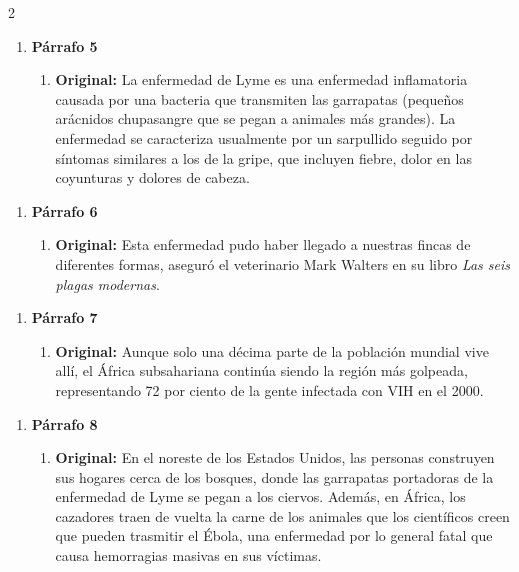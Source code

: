 \documentclass{article}
\begin{document}
\begin{multicols}{2}
	\begin{enumerate}[label={{\textcolor{trueblue}{\textbf{Ej}. \arabic*.0}}}, start=5]
		\item \textbf{Párrafo 5}
		\begin{enumerate}
			\item \textbf{Original:} La enfermedad de Lyme es una enfermedad inflamatoria causada por
			una bacteria que transmiten las garrapatas (pequeños arácnidos chupasangre que
			se pegan a animales más grandes). La enfermedad se caracteriza usualmente por
			un sarpullido seguido por síntomas similares a los de la gripe, que incluyen fiebre,
			dolor en las coyunturas y dolores de cabeza.
		\end{enumerate}
	\end{enumerate}
	
	\begin{enumerate}[label={{\textcolor{trueblue}{\textbf{Ej}. \arabic*.0}}}, start=6]
		\item \textbf{Párrafo 6}
		\begin{enumerate}
			\item \textbf{Original:} Esta enfermedad pudo haber llegado a nuestras fincas de diferentes formas, aseguró el veterinario Mark Walters en su libro \textit{Las seis plagas modernas}.
		\end{enumerate}
	\end{enumerate}
	
	\begin{enumerate}[label={{\textcolor{trueblue}{\textbf{Ej}. \arabic*.0}}}, start=7]
		\item \textbf{Párrafo 7}
		\begin{enumerate}
			\item \textbf{Original:} Aunque solo una décima parte de la población mundial vive allí, el África
			subsahariana continúa siendo la región más golpeada, representando 72 por ciento
			de la gente infectada con VIH en el 2000.
		\end{enumerate}
	\end{enumerate}
	
	\begin{enumerate}[label={{\textcolor{trueblue}{\textbf{Ej}. \arabic*.0}}}, start=8]
		\item \textbf{Párrafo 8}
		\begin{enumerate}
			\item \textbf{Original:}  En el noreste de los Estados Unidos, las personas construyen sus
			hogares cerca de los bosques, donde las garrapatas portadoras de la enfermedad
			de Lyme se pegan a los ciervos. Además, en África, los cazadores traen de vuelta
			la carne de los animales que los científicos creen que pueden trasmitir el Ébola, una
			enfermedad por lo general fatal que causa hemorragias masivas en sus víctimas.
		\end{enumerate}
	\end{enumerate}
	
\end{multicols}
\end{document}
